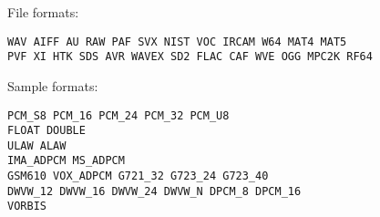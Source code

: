 File formats:
\begin{verbatim}
WAV AIFF AU RAW PAF SVX NIST VOC IRCAM W64 MAT4 MAT5
PVF XI HTK SDS AVR WAVEX SD2 FLAC CAF WVE OGG MPC2K RF64
\end{verbatim}

Sample formats:
\begin{verbatim}
PCM_S8 PCM_16 PCM_24 PCM_32 PCM_U8
FLOAT DOUBLE
ULAW ALAW
IMA_ADPCM MS_ADPCM
GSM610 VOX_ADPCM G721_32 G723_24 G723_40
DWVW_12 DWVW_16 DWVW_24 DWVW_N DPCM_8 DPCM_16
VORBIS
\end{verbatim}


